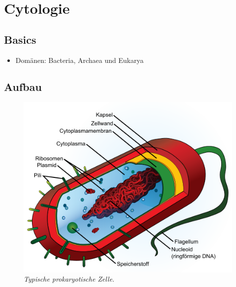\section{Cytologie}

\subsection{Basics}

	\begin{itemize}
		\item Domänen: Bacteria, Archaea und Eukarya
	\end{itemize}

\subsection{Aufbau}

	\begin{figure}[ht!]
	\leavevmode
	\begin{center}
	\includegraphics[scale=0.47]{./pictures/avg_prokaryote_cell_500}
	\end{center}
	\caption{\slshape{Typische prokaryotische Zelle.}}
	\label{fig:prokarya}
	\end{figure}

